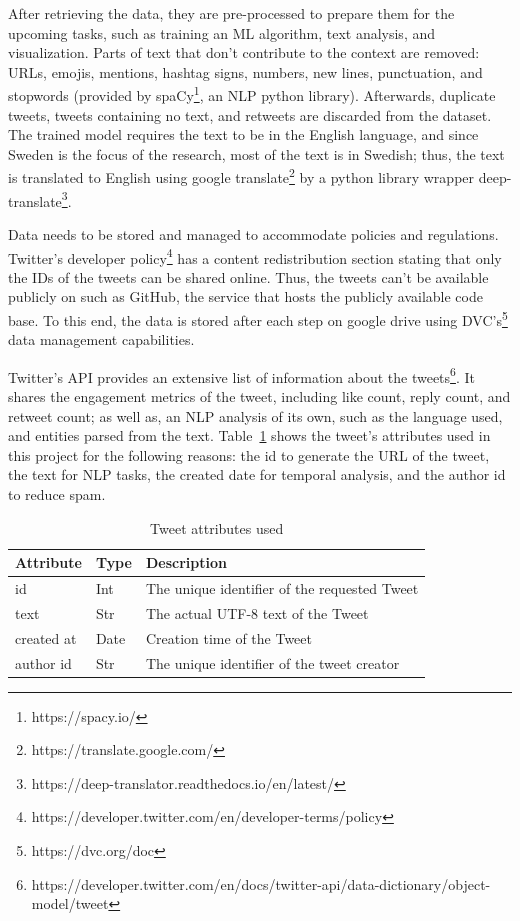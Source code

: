 After retrieving the data, they are pre-processed to prepare them for the upcoming tasks, such as training an
\ac{ML} algorithm, text analysis, and visualization.  Parts of text that don't contribute to the
context are removed: \ac{URL}s, emojis, mentions, hashtag signs, numbers, new lines, punctuation,
and stopwords (provided by spaCy\footnote{https://spacy.io/}, an \ac{NLP} python library).
Afterwards, duplicate tweets, tweets containing no text, and retweets are discarded from the
dataset. The trained model requires the text to be in the English language, and since Sweden
is the focus of the research, most of the text is in Swedish; thus, the text is translated to
English using google translate\footnote{https://translate.google.com/} by a python library wrapper
deep-translate\footnote{https://deep-translator.readthedocs.io/en/latest/}. 

Data needs to be stored and managed to accommodate policies and regulations. Twitter's developer
policy\footnote{https://developer.twitter.com/en/developer-terms/policy} has a content
redistribution section stating that only the IDs of the tweets can be shared online. Thus, the
tweets can't be available publicly on such as GitHub, the service that hosts the publicly available
code base. To this end, the data is stored after each step on google drive using
\ac{DVC}'s\footnote{https://dvc.org/doc} data management capabilities.


Twitter's API provides an extensive list of information about the
tweets\footnote{https://developer.twitter.com/en/docs/twitter-api/data-dictionary/object-model/tweet}.
It shares the engagement metrics of the tweet, including like count, reply count, and retweet count;
as well as, an \ac{NLP} analysis of its own, such as the language used, and entities parsed from the
text. Table~\ref{tab:tweet_attr} shows the tweet's attributes used in this project for the following reasons: the id to
generate the \ac{URL} of the tweet, the text for \ac{NLP} tasks, the created date for temporal
analysis, and the author id to reduce spam.

\begin{table}
  \center
  \begin{tabular}{|l|l|l|}
    \hline
    Attribute & Type & Description \\
    \hline
    id & Int & The unique identifier of the requested Tweet \\
    \hline
    text & Str & The actual UTF-8 text of the Tweet \\
    \hline
    created at & Date  & Creation time of the Tweet \\
    \hline
    author id & Str & The unique identifier of the tweet creator \\
    \hline
  \end{tabular}
  \caption{Tweet attributes used}
  \label{tab:tweet_attr}
\end{table}

